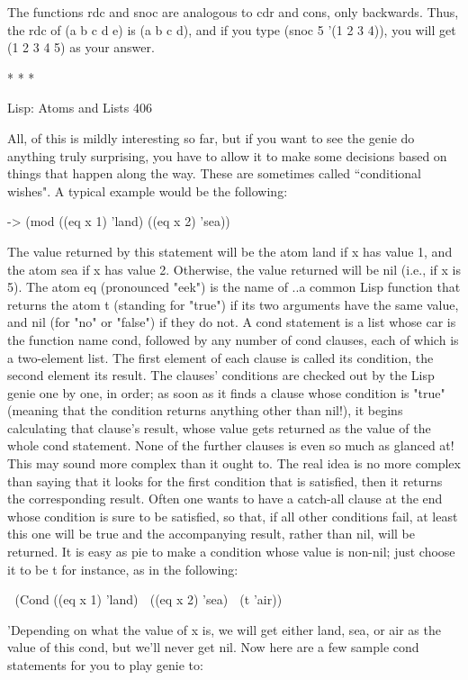 The functions rdc and snoc are analogous to cdr and cons, only backwards. Thus, the
rdc of (a b c d e) is (a b c d), and if you type (snoc 5 '(1 2 3 4)), you will get (1 2 3 4
5) as your answer.

                                        *   *   *




Lisp: Atoms and Lists                                                                  406

All, of this is mildly interesting so far, but if you want to see the genie do anything
truly surprising, you have to allow it to make some decisions based on things that
happen along the way. These are sometimes called “conditional wishes". A typical
example would be the following:

-> (mod ((eq x 1) 'land) ((eq x 2) 'sea))

The value returned by this statement will be the atom land if x has value 1, and the
atom sea if x has value 2. Otherwise, the value returned will be nil (i.e., if x is 5). The
atom eq (pronounced "eek") is the name of ..a common Lisp function that returns the
atom t (standing for "true") if its two arguments have the same value, and nil (for "no"
or "false") if they do not.
        A cond statement is a list whose car is the function name cond, followed by
any number of cond clauses, each of which is a two-element list. The first element of
each clause is called its condition, the second element its result. The clauses'
conditions are checked out by the Lisp genie one by one, in order; as soon as it finds a
clause whose condition is "true" (meaning that the condition returns anything other
than nil!), it begins calculating that clause's result, whose value gets returned as the
value of the whole cond statement. None of the further clauses is even so much as
glanced at! This may sound more complex than it ought to. The real idea is no more
complex than saying that it looks for the first condition that is satisfied, then it returns
the corresponding result.
        Often one wants to have a catch-all clause at the end whose condition is sure
to be satisfied, so that, if all other conditions fail, at least this one will be true and the
accompanying result, rather than nil, will be returned. It is easy as pie to make a
condition whose value is non-nil; just choose it to be t for instance, as in the
following:

       (Cond ((eq x 1) 'land)
       ((eq x 2) 'sea)
       (t 'air))


'Depending on what the value of x is, we will get either land, sea, or air as the value
of this cond, but we'll never get nil. Now here are a few sample cond statements for
you to play genie to:

